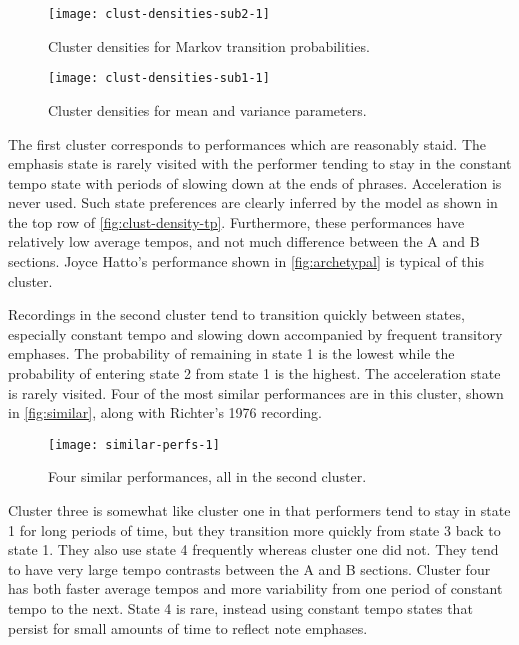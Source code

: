 \documentclass[12pt]{article}
\begin{document}
\begin{figure}[t]
  \centering
  \texttt{[image: clust-densities-sub2-1]}
  \caption{Cluster densities for Markov transition probabilities.}
  \label{fig:clust-density-tp}
\end{figure}
\begin{figure}[t]
  \centering
  \texttt{[image: clust-densities-sub1-1]}
  \caption{Cluster densities for mean and variance parameters.}
  \label{fig:clust-density-mv}
\end{figure}
The first cluster corresponds to performances which are reasonably
staid. The emphasis state is rarely visited with the performer tending
to stay in the constant tempo state with periods of slowing down at
the ends of phrases. Acceleration is never used. Such state
preferences are clearly inferred by the model as shown in the
top row of \autoref{fig:clust-density-tp}. Furthermore, these
performances have relatively low average tempos, and not much
difference between the A and B sections. Joyce Hatto's performance
shown in \autoref{fig:archetypal} is typical of this cluster.

Recordings in the second
cluster tend to transition quickly between states, especially constant
tempo and slowing down accompanied by frequent transitory
emphases. The probability of remaining in state 1 is the lowest while
the probability of entering state 2 from state 1 is 
the highest. The acceleration state is rarely visited. Four of
the most similar performances are in this cluster, shown in
\autoref{fig:similar}, along with Richter's 1976 recording.
\begin{figure}[t]
  \centering
  \texttt{[image: similar-perfs-1]}
  \caption{Four similar performances, all in the second cluster.}
  \label{fig:similar}
\end{figure}

Cluster three is somewhat like cluster one in that performers tend to
stay in state 1 for long periods of time, but they transition more
quickly from state 3 back to state 1. They also use state 4 frequently
whereas cluster one
did not. They tend to have very large tempo
contrasts between the A and B sections.
Cluster four has both faster average tempos and more variability from one period of
constant tempo to the next. State 4 is rare, instead using constant tempo 
states that persist for small amounts of time to reflect note
emphases.
\end{document}
